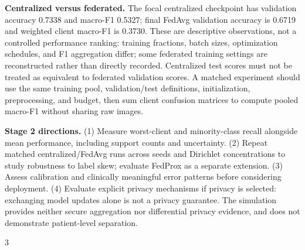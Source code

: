 \documentclass[10pt,a4paper]{article}
\begin{document}
\textbf{Centralized versus federated.} The focal centralized checkpoint has validation accuracy 0.7338 and macro-F1 0.5327; final FedAvg validation accuracy is 0.6719 and weighted client macro-F1 is 0.3730. These are descriptive observations, not a controlled performance ranking: training fractions, batch sizes, optimization schedules, and F1 aggregation differ; some federated training settings are reconstructed rather than directly recorded. Centralized test scores must not be treated as equivalent to federated validation scores. A matched experiment should use the same training pool, validation/test definitions, initialization, preprocessing, and budget, then sum client confusion matrices to compute pooled macro-F1 without sharing raw images.

\textbf{Stage 2 directions.} (1) Measure worst-client and minority-class recall alongside mean performance, including support counts and uncertainty. (2) Repeat matched centralized/FedAvg runs across seeds and Dirichlet concentrations to study robustness to label skew; evaluate FedProx as a separate extension. (3) Assess calibration and clinically meaningful error patterns before considering deployment. (4) Evaluate explicit privacy mechanisms if privacy is selected: exchanging model updates alone is not a privacy guarantee. The simulation provides neither secure aggregation nor differential privacy evidence, and does not demonstrate patient-level separation.

{\small
\begin{thebibliography}{3}

\end{thebibliography}
}
\end{document}
